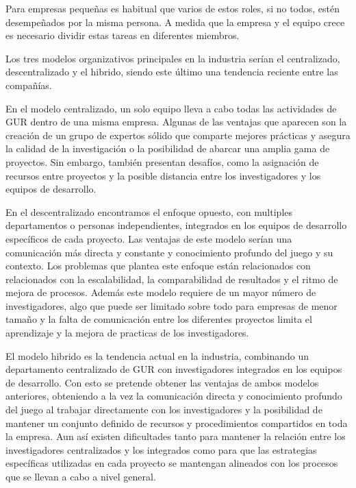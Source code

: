 Para empresas pequeñas es habitual que varios de estos roles, si no todos, estén desempeñados por la misma persona. A medida que la empresa y el equipo crece es necesario dividir estas tareas en diferentes miembros.

Los tres modelos organizativos principales en la industria serían el centralizado, descentralizado y el hibrido, siendo este último una tendencia reciente entre las compañías.

En el modelo centralizado, un solo equipo lleva a cabo todas las actividades de GUR dentro de una misma empresa. Algunas de las ventajas que aparecen son la creación de un grupo de expertos sólido que comparte mejores prácticas y asegura la calidad de la investigación o la posibilidad de abarcar una amplia gama de proyectos. Sin embargo, también presentan desafíos, como la asignación de recursos entre proyectos y la posible distancia entre los investigadores y los equipos de desarrollo.

En el descentralizado encontramos el enfoque opuesto, con multiples departamentos o personas independientes, integrados en los equipos de desarrollo específicos de cada proyecto. Las ventajas de este modelo serían una comunicación más directa y constante y conocimiento profundo del juego y su contexto. Los problemas que plantea este enfoque están relacionados con relacionados con la escalabilidad, la comparabilidad de resultados y el ritmo de mejora de procesos. Además este modelo requiere de un mayor número de investigadores, algo que puede ser limitado sobre todo para empresas de menor tamaño y la falta de comunicación entre los diferentes proyectos limita el aprendizaje y la mejora de practicas de los investigadores.

El modelo hibrido es la tendencia actual en la industria, combinando un departamento centralizado de GUR con investigadores integrados en los equipos de desarrollo. Con esto se pretende obtener las ventajas de ambos modelos anteriores, obteniendo a la vez la comunicación directa y conocimiento profundo del juego al trabajar directamente con los investigadores y la posibilidad de mantener un conjunto definido de recursos y procedimientos compartidos en toda la empresa. Aun así existen dificultades tanto para mantener la relación entre los investigadores centralizados y los integrados como para que las estrategias específicas utilizadas en cada proyecto se mantengan alineados con los procesos que se llevan a cabo a nivel general.


